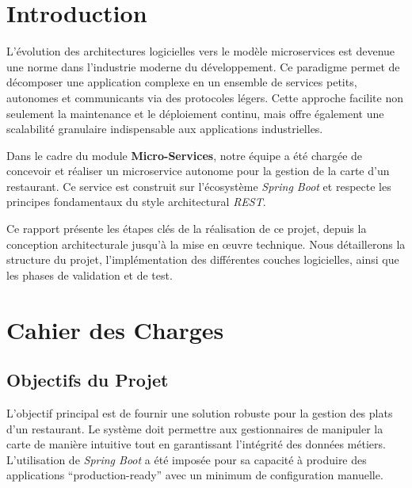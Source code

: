 \documentclass[12pt,a4paper,french]{article}
\begin{document}
\tableofcontents
\newpage

\section{Introduction}
L'évolution des architectures logicielles vers le modèle microservices est devenue une norme dans
l'industrie moderne du développement. Ce paradigme permet de décomposer une application complexe en
un ensemble de services petits, autonomes et communicants via des protocoles légers. Cette approche
facilite non seulement la maintenance et le déploiement continu, mais offre également une
scalabilité granulaire indispensable aux applications industrielles.

Dans le cadre du module \textbf{Micro-Services}, notre équipe a été chargée de concevoir et réaliser
un microservice autonome pour la gestion de la carte d'un restaurant. Ce service est construit sur
l'écosystème \textit{Spring Boot} et respecte les principes fondamentaux du style architectural
\textit{REST}.

Ce rapport présente les étapes clés de la réalisation de ce projet, depuis la conception
architecturale jusqu'à la mise en \oe{}uvre technique. Nous détaillerons la structure du projet,
l'implémentation des différentes couches logicielles, ainsi que les phases de validation et de test.

\section{Cahier des Charges}
\subsection{Objectifs du Projet}
L'objectif principal est de fournir une solution robuste pour la gestion des plats d'un restaurant.
Le système doit permettre aux gestionnaires de manipuler la carte de manière intuitive tout en
garantissant l'intégrité des données métiers. L'utilisation de \textit{Spring Boot} a été imposée
pour sa capacité à produire des applications ``production-ready'' avec un minimum de configuration
manuelle.
\end{document}

